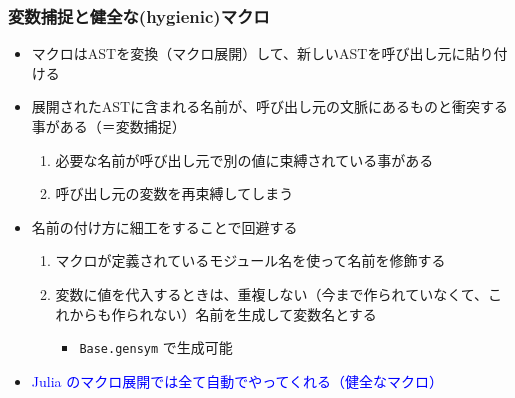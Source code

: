 \begin{frame}[containsverbatim]
\frametitle{変数捕捉と健全な(hygienic)マクロ}
\begin{itemize}
  \item マクロはASTを変換（マクロ展開）して、新しいASTを呼び出し元に貼り付ける
    \item 展開されたASTに含まれる名前が、呼び出し元の文脈にあるものと衝突する事がある（＝変数捕捉）
    \begin{enumerate}
      \item 必要な名前が呼び出し元で別の値に束縛されている事がある
      \item 呼び出し元の変数を再束縛してしまう
    \end{enumerate}
  \item 名前の付け方に細工をすることで回避する
    \begin{enumerate}
    \item マクロが定義されているモジュール名を使って名前を修飾する
    \item 変数に値を代入するときは、重複しない（今まで作られていなくて、これからも作られない）名前を生成して変数名とする
      \begin{itemize}
        \item \verb|Base.gensym| で生成可能
      \end{itemize}
    \end{enumerate}
    \item \textcolor{blue}{Julia のマクロ展開では全て自動でやってくれる（健全なマクロ）}
\end{itemize}
\end{frame}

